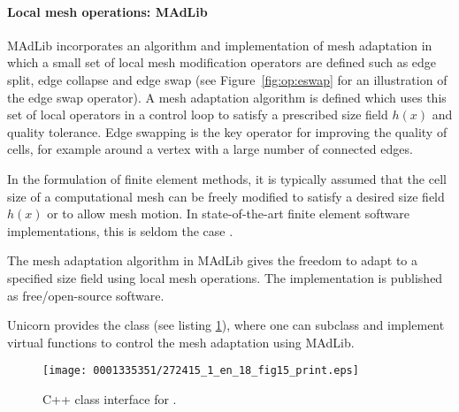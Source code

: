 \paragraph{Local mesh operations: MAdLib}

MAdLib incorporates an algorithm and implementation of mesh adaptation
in which a small set of local mesh modification operators are defined
such as edge split, edge collapse and edge swap (see
Figure~\ref{fig:op:eswap} for an illustration of the edge swap
operator). A mesh adaptation algorithm is defined which uses this set
of local operators in a control loop to satisfy a prescribed size
field $h(x)$ and quality tolerance. Edge swapping is the key operator
for improving the quality of cells, for example around a vertex with a
large number of connected edges.

In the formulation of finite element methods, it is typically assumed
that the cell size of a computational mesh can be freely modified to
satisfy a desired size field $h(x)$ or to allow mesh motion. In
state-of-the-art finite element software implementations, this is
seldom the case \citep{BangerthHartmannKanschat2007, COMSOL2009}.

The mesh adaptation algorithm in MAdLib gives the freedom to adapt to
a specified size field using local mesh operations. The implementation
is published as free/open-source software.

Unicorn provides the  class (see listing
\ref{code:MeshAdaptInterface}), where one can subclass and implement
virtual functions to control the mesh adaptation using MAdLib.

\begin{figure}
\bwfig
\texttt{[image: 0001335351/272415\_1\_en\_18\_fig15\_print.eps]}
\caption{C++ class interface for .}
\label{code:MeshAdaptInterface}
\end{figure}

